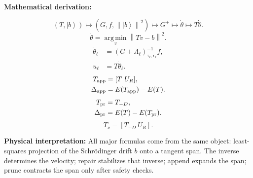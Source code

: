 \documentclass[10pt,twocolumn]{article}
\newcommand{\ket}[1]{\left|#1\right\rangle}
\newcommand{\norm}[1]{\left\lVert #1\right\rVert}
\newcommand{\argmin}{\operatorname*{arg\,min}}
\newcommand{\deriv}{%
  \par\noindent\textcolor{deepviolet}{\textbf{Mathematical derivation:}}\par\vspace{-1mm}}
\newcommand{\phys}[1]{%
  \par\smallskip
  \noindent\textcolor{deepgreen}{\textbf{Physical interpretation:}} #1
  \par\smallskip}
\begin{document}
\deriv
\[
(T,\ket b)
\longmapsto
(G,f,\norm{\ket b}^2)
\longmapsto
G^+
\longmapsto
\dot\theta
\longmapsto
T\dot\theta.
\]
\[
\dot\theta
=
\argmin_v\norm{Tv-b}^2.
\]
\[
\begin{aligned}
\dot\theta_\ell
&=(G+\Lambda_\ell)_{\tau_\ell,\epsilon_\ell}^{-1}f,\\
u_\ell&=T\dot\theta_\ell.
\end{aligned}
\]
\[
\begin{aligned}
T_{\rm app}&=[T~U_R],\\
\Delta_{\rm app}
&=E(T_{\rm app})-E(T).
\end{aligned}
\]
\[
\begin{aligned}
T_{\rm pr}&=T_{-D},\\
\Delta_{\rm pr}
&=E(T)-E(T_{\rm pr}).
\end{aligned}
\]
\[
T_\nu=[T_{-D}~U_R].
\]

\phys{All major formulas come from the same object: least-squares projection of
the Schrödinger drift \(b\) onto a tangent span. The inverse determines the
velocity; repair stabilizes that inverse; append expands the span; prune
contracts the span only after safety checks.}
\end{document}
